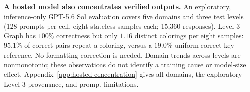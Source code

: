 \noindent\textbf{A hosted model also concentrates verified outputs.}
\label{sec:hosted-concentration}
An exploratory, inference-only GPT-5.6 Sol evaluation covers five domains and
three test levels (128 prompts per cell, eight stateless samples each; 15,360
responses). Level-3 Graph has $100\%$ correctness but only $1.16$ distinct
colorings per eight samples: $95.1\%$ of correct pairs repeat a coloring,
versus a $19.0\%$ uniform-correct-key reference. No formatting correction is
needed. Domain trends across levels are nonmonotonic; these observations do
not identify a training cause or model-size effect. Appendix~\ref{app:hosted-concentration}
gives all domains, the exploratory Level-3 provenance, and prompt limitations.

